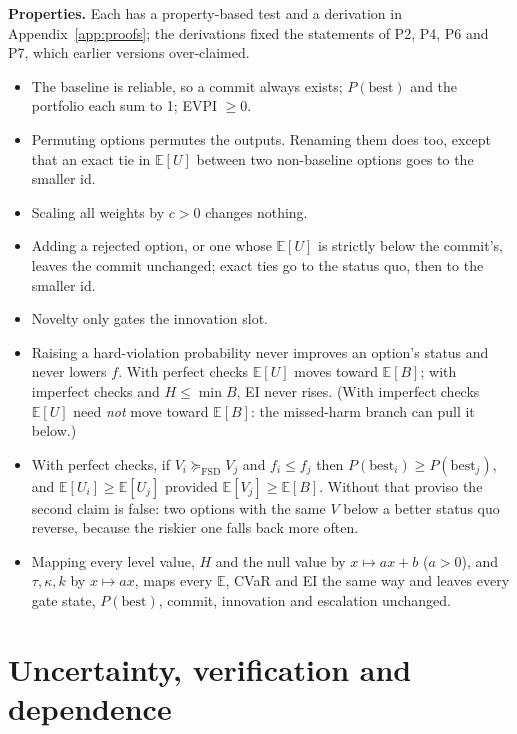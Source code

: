 \documentclass[11pt]{article}
\theoremstyle{definition}
\begin{document}
\textbf{Properties.} Each has a property-based test and a derivation in
Appendix~\ref{app:proofs}; the derivations fixed the statements of P2, P4, P6 and P7, which
earlier versions over-claimed.
\begin{itemize}[leftmargin=1.6em,itemsep=1pt]
\item[\textbf{P1}] The baseline is reliable, so a commit always exists; $P(\mathrm{best})$ and the
portfolio each sum to 1; EVPI $\ge0$.
\item[\textbf{P2}] Permuting options permutes the outputs. Renaming them does too, except that an
exact tie in $\mathbb E[U]$ between two non-baseline options goes to the smaller id.
\item[\textbf{P3}] Scaling all weights by $c>0$ changes nothing.
\item[\textbf{P4}] Adding a rejected option, or one whose $\mathbb{E}[U]$ is strictly below the
commit's, leaves the commit unchanged; exact ties go to the status quo, then to the smaller id.
\item[\textbf{P5}] Novelty only gates the innovation slot.
\item[\textbf{P6}] Raising a hard-violation probability never improves an option's status and never
lowers $f$. With perfect checks $\mathbb E[U]$ moves toward $\mathbb E[B]$; with imperfect checks and
$H\le\min B$, EI never rises. (With imperfect checks $\mathbb E[U]$ need \emph{not} move toward
$\mathbb E[B]$: the missed-harm branch can pull it below.)
\item[\textbf{P7}] With perfect checks, if $V_i\succeq_{\mathrm{FSD}}V_j$ and $f_i\le f_j$ then
$P(\mathrm{best}_i)\ge P(\mathrm{best}_j)$, and $\mathbb E[U_i]\ge\mathbb E[U_j]$ provided
$\mathbb E[V_j]\ge\mathbb E[B]$. Without that proviso the second claim is false: two options with the
same $V$ below a better status quo reverse, because the riskier one falls back more often.
\item[\textbf{P8}] Mapping every level value, $H$ and the null value by $x\mapsto ax+b$ ($a>0$), and
$\tau,\kappa,k$ by $x\mapsto ax$, maps every $\mathbb E$, CVaR and EI the same way and leaves every
gate state, $P(\mathrm{best})$, commit, innovation and escalation unchanged.
\end{itemize}

\section{Uncertainty, verification and dependence}\label{sec:uncertainty}
\end{document}

